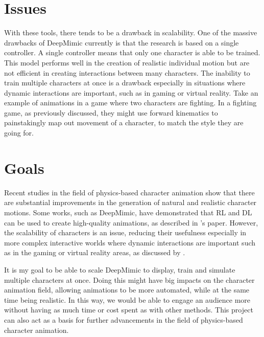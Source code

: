 \documentclass{l4proj}
\begin{document}
\section{Issues}
With these tools, there tends to be a drawback in scalability. One of the massive drawbacks of DeepMimic currently is that the research is based on a single controller. A single controller means that only one character is able to be trained. This model performs well in the creation of realistic individual motion but are not efficient in creating interactions between many characters. The inability to train multiple characters at once is a drawback especially in situations where dynamic interactions are important, such as in gaming or virtual reality. Take an example of animations in a game where two characters are fighting. In a fighting game, as previously discussed, they might use forward kinematics to painstakingly map out movement of a character, to match the style they are going for.

\section{Goals}
Recent studies in the field of physics-based character animation show that there are substantial improvements in the generation of natural and realistic character motions. Some works, such as DeepMimic, have demonstrated that RL and DL can be used to create high-quality animations, as described in \cite{deepmimic}'s paper. However, the scalability of characters is an issue, reducing their usefulness especially in more complex interactive worlds where dynamic interactions are important such as in the gaming or virtual reality areas, as discussed by \cite{Holden2017}.

It is my goal to be able to scale DeepMimic to display, train and simulate multiple characters at once. Doing this might have big impacts on the character animation field, allowing animations to be more automated, while at the same time being realistic. In this way, we would be able to engage an audience more without having as much time or cost spent as with other methods. This project can also act as a basis for further advancements in the field of physics-based character animation.

\end{document}
